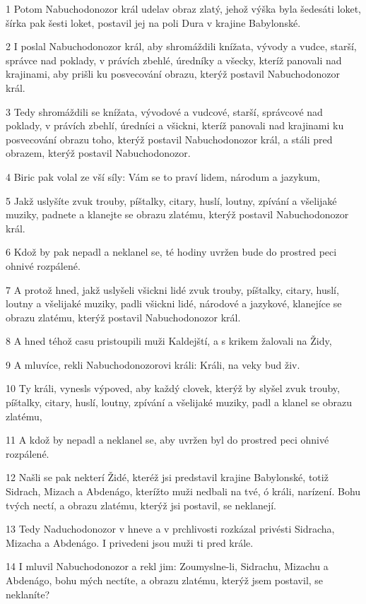 \par 1 Potom Nabuchodonozor král udelav obraz zlatý, jehož výška byla šedesáti loket, šírka pak šesti loket, postavil jej na poli Dura v krajine Babylonské.
\par 2 I poslal Nabuchodonozor král, aby shromáždili knížata, vývody a vudce, starší, správce nad poklady, v právích zbehlé, úredníky a všecky, kteríž panovali nad krajinami, aby prišli ku posvecování obrazu, kterýž postavil Nabuchodonozor král.
\par 3 Tedy shromáždili se knížata, vývodové a vudcové, starší, správcové nad poklady, v právích zbehlí, úredníci a všickni, kteríž panovali nad krajinami ku posvecování obrazu toho, kterýž postavil Nabuchodonozor král, a stáli pred obrazem, kterýž postavil Nabuchodonozor.
\par 4 Biric pak volal ze vší síly: Vám se to praví lidem, národum a jazykum,
\par 5 Jakž uslyšíte zvuk trouby, píštalky, citary, huslí, loutny, zpívání a všelijaké muziky, padnete a klanejte se obrazu zlatému, kterýž postavil Nabuchodonozor král.
\par 6 Kdož by pak nepadl a neklanel se, té hodiny uvržen bude do prostred peci ohnivé rozpálené.
\par 7 A protož hned, jakž uslyšeli všickni lidé zvuk trouby, píštalky, citary, huslí, loutny a všelijaké muziky, padli všickni lidé, národové a jazykové, klanejíce se obrazu zlatému, kterýž postavil Nabuchodonozor král.
\par 8 A hned téhož casu pristoupili muži Kaldejští, a s krikem žalovali na Židy,
\par 9 A mluvíce, rekli Nabuchodonozorovi králi: Králi, na veky bud živ.
\par 10 Ty králi, vynesls výpoved, aby každý clovek, kterýž by slyšel zvuk trouby, píštalky, citary, huslí, loutny, zpívání a všelijaké muziky, padl a klanel se obrazu zlatému,
\par 11 A kdož by nepadl a neklanel se, aby uvržen byl do prostred peci ohnivé rozpálené.
\par 12 Našli se pak nekterí Židé, kteréž jsi predstavil krajine Babylonské, totiž Sidrach, Mizach a Abdenágo, kterížto muži nedbali na tvé, ó králi, narízení. Bohu tvých nectí, a obrazu zlatému, kterýž jsi postavil, se neklanejí.
\par 13 Tedy Naduchodonozor v hneve a v prchlivosti rozkázal privésti Sidracha, Mizacha a Abdenágo. I privedeni jsou muži ti pred krále.
\par 14 I mluvil Nabuchodonozor a rekl jim: Zoumyslne-li, Sidrachu, Mizachu a Abdenágo, bohu mých nectíte, a obrazu zlatému, kterýž jsem postavil, se neklaníte?
